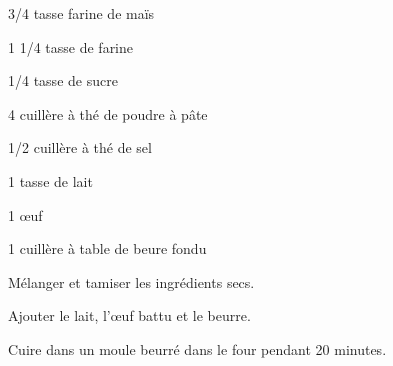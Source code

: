 


\totaltime{}


\begin{ingredients}
    \item 3/4 tasse farine de maïs
    \item 1 1/4 tasse de farine
    \item 1/4 tasse de sucre
    \item 4 cuillère à thé de poudre à pâte
    \item 1/2 cuillère à thé de sel
    \item 1 tasse de lait
    \item 1 œuf
    \item 1 cuillère à table de beure fondu
\end{ingredients}

\begin{steps}
    \item Mélanger et tamiser les ingrédients secs.
    \item Ajouter le lait, l’œuf battu et le beurre.
    \item Cuire dans un moule beurré dans le four pendant 20 minutes.
\end{steps}

